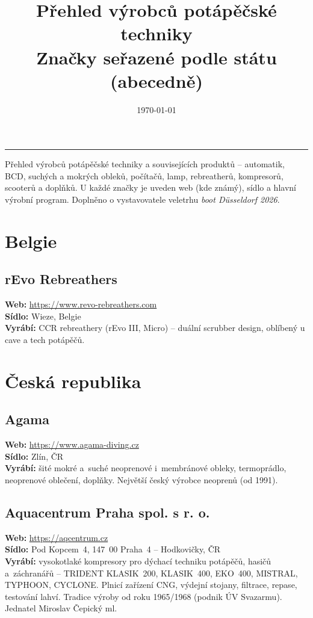 \documentclass[11pt,a4paper]{article}
\title{\color{headerblue}\textbf{Přehled výrobců potápěčské techniky}\\[0.3em]
\large\color{black}\normalfont Značky seřazené podle státu (abecedně)}
\author{}
\date{\today}
\begin{document}
\maketitle
\thispagestyle{empty}

\vspace{-1em}
\hrule
\vspace{1em}

\noindent
Přehled výrobců potápěčské techniky a souvisejících produktů -- automatik, BCD, suchých a mokrých obleků, počítačů, lamp, rebreatherů, kompresorů, scooterů a doplňků. U každé značky je uveden web (kde známý), sídlo a hlavní výrobní program. Doplněno o vystavovatele veletrhu \emph{boot Düsseldorf 2026}.

\tableofcontents
\newpage

\section{Belgie}

\subsection{rEvo Rebreathers}
\textbf{Web:} \url{https://www.revo-rebreathers.com} \\
\textbf{Sídlo:} Wieze, Belgie \\
\textbf{Vyrábí:} CCR rebreathery (rEvo III, Micro) -- duální scrubber design, oblíbený u cave a tech potápěčů.

\section{Česká republika}

\subsection{Agama}
\textbf{Web:} \url{https://www.agama-diving.cz} \\
\textbf{Sídlo:} Zlín, ČR \\
\textbf{Vyrábí:} šité mokré a~suché neoprenové i~membránové obleky, termoprádlo, neoprenové oblečení, doplňky. Největší český výrobce neoprenů (od 1991).

\subsection{Aquacentrum Praha spol. s r. o.}
\textbf{Web:} \url{https://aqcentrum.cz} \\
\textbf{Sídlo:} Pod Kopcem~4, 147~00 Praha~4 -- Hodkovičky, ČR \\
\textbf{Vyrábí:} vysokotlaké kompresory pro dýchací techniku potápěčů, hasičů a~záchranářů -- TRIDENT KLASIK~200, KLASIK~400, EKO~400, MISTRAL, TYPHOON, CYCLONE. Plnicí zařízení CNG, výdejní stojany, filtrace, repase, testování lahví. Tradice výroby od roku 1965/1968 (podnik ÚV Svazarmu). Jednatel Miroslav Čepický ml.
\end{document}

